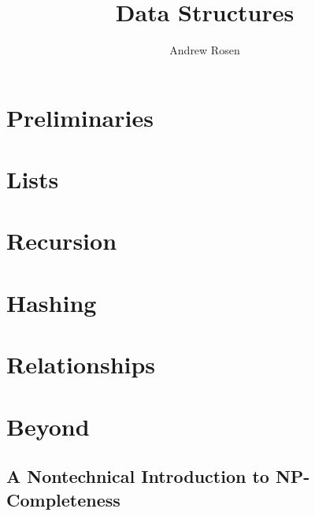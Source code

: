 \documentclass[10pt,a4paper]{book}
\begin{document}
\title{Data Structures}
\author{Andrew Rosen}
\date{}
\maketitle
\tableofcontents

\part{Preliminaries}











\part{Lists}
\label{part-list}





\part{Recursion}







\part{Hashing}













\part{Relationships}










\part{Beyond}

\chapter{A Nontechnical Introduction to NP-Completeness}
\end{document}
